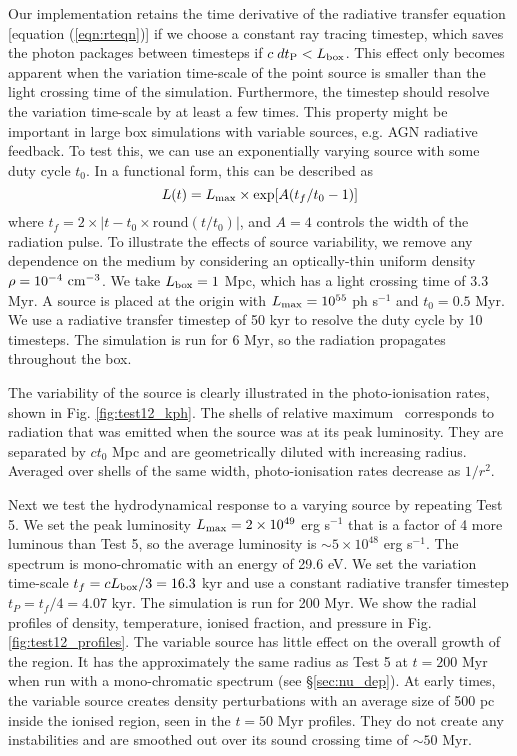 \documentclass[useAMS,usenatbib]{mn2e}
\begin{document}
Our implementation retains the time derivative of the radiative
transfer equation [equation (\ref{eqn:rteqn})] if we choose a constant
ray tracing timestep, which saves the photon packages between
timesteps if $c\;dt_{\rm P} < L_{\rm box}$.  This effect only becomes
apparent when the variation time-scale of the point source is smaller
than the light crossing time of the simulation.  Furthermore, the
timestep should resolve the variation time-scale by at least a few
times.  This property might be important in large box simulations with
variable sources, e.g. AGN radiative feedback.  To test this, we can
use an exponentially varying source with some duty cycle $t_0$.  In a
functional form, this can be described as
%
\begin{equation}
  \label{eqn:test12}
  L(t) = L_{\rm max} \times \exp[A(t_f/t_0 - 1)]
\end{equation}
%
where $t_f = 2 \times |t - t_0 \times \mathrm{round}(t/t_0)|$, and
$A=4$ controls the width of the radiation pulse.  To illustrate the
effects of source variability, we remove any dependence on the medium
by considering an optically-thin uniform density $\rho =
10^{-4}~\cubecm$.  We take $L_{\rm box} = 1$ Mpc, which has a light
crossing time of 3.3 Myr.  A source is placed at the origin with
$L_{\rm max} = 10^{55}$ ph s$^{-1}$ and $t_0 = 0.5$ Myr.  We use a
radiative transfer timestep of 50 kyr to resolve the duty cycle by 10
timesteps.  The simulation is run for 6 Myr, so the radiation
propagates throughout the box.

The variability of the source is clearly illustrated in the
photo-ionisation rates, shown in Fig. \ref{fig:test12_kph}.  The
shells of relative maximum \kph~corresponds to radiation that was
emitted when the source was at its peak luminosity.  They are
separated by $ct_0$ Mpc and are geometrically diluted with increasing
radius.  Averaged over shells of the same width, photo-ionisation
rates decrease as $1/r^2$.

Next we test the hydrodynamical response to a varying source by
repeating Test 5.  We set the peak luminosity $L_{\rm max} = 2 \times
10^{49}$ erg s$^{-1}$ that is a factor of 4 more luminous than Test 5,
so the average luminosity is $\sim 5 \times 10^{48}$ erg s$^{-1}$.
The spectrum is mono-chromatic with an energy of 29.6 eV.  We set the
variation time-scale $t_f = cL_{\rm box}/3 = 16.3$ kyr and use a
constant radiative transfer timestep $t_P = t_f/4 = 4.07$ kyr.  The
simulation is run for 200 Myr.  We show the radial profiles of
density, temperature, ionised fraction, and pressure in Fig.
\ref{fig:test12_profiles}.  The variable source has little effect on
the overall growth of the \hii region.  It has the approximately
the same radius as Test 5 at $t = 200$ Myr when run with a
mono-chromatic spectrum (see \S\ref{sec:nu_dep}).  At early times, the
variable source creates density perturbations with an average size of
500 pc inside the ionised region, seen in the $t = 50$ Myr profiles.
They do not create any instabilities and are smoothed out over its
sound crossing time of $\sim 50$ Myr.
\end{document}
